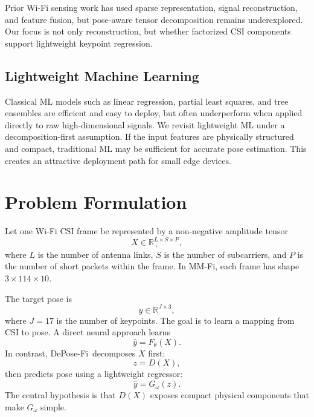 \documentclass[letterpaper]{article}
\newcommand{\method}{DePose-Fi}
\begin{document}
Prior Wi-Fi sensing work has used sparse representation, signal reconstruction, and feature fusion, but pose-aware tensor decomposition remains underexplored. Our focus is not only reconstruction, but whether factorized CSI components support lightweight keypoint regression.

\subsection{Lightweight Machine Learning}

Classical ML models such as linear regression, partial least squares, and tree ensembles are efficient and easy to deploy, but often underperform when applied directly to raw high-dimensional signals. We revisit lightweight ML under a decomposition-first assumption. If the input features are physically structured and compact, traditional ML may be sufficient for accurate pose estimation. This creates an attractive deployment path for small edge devices.

\section{Problem Formulation}

Let one Wi-Fi CSI frame be represented by a non-negative amplitude tensor
\begin{equation}
    X \in \mathbb{R}_{+}^{L \times S \times P},
\end{equation}
where $L$ is the number of antenna links, $S$ is the number of subcarriers, and $P$ is the number of short packets within the frame. In MM-Fi, each frame has shape $3 \times 114 \times 10$.

The target pose is
\begin{equation}
    y \in \mathbb{R}^{J \times 3},
\end{equation}
where $J=17$ is the number of keypoints. The goal is to learn a mapping from CSI to pose. A direct neural approach learns
\begin{equation}
    \hat{y} = F_\theta(X).
\end{equation}
In contrast, \method\ decomposes $X$ first:
\begin{equation}
    z = D(X),
\end{equation}
then predicts pose using a lightweight regressor:
\begin{equation}
    \hat{y} = G_\omega(z).
\end{equation}
The central hypothesis is that $D(X)$ exposes compact physical components that make $G_\omega$ simple.
\end{document}

